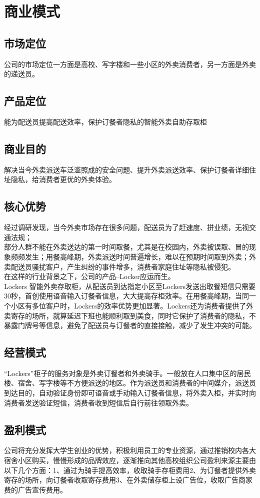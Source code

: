 \documentclass[violet]{main}
\begin{document}
		\section{商业模式}
			\subsection{市场定位}
				公司的市场定位一方面是高校、写字楼和一些小区的外卖消费者，另一方面是外卖的递送员。
			\subsection{产品定位}
				能为配送员提高配送效率，保护订餐者隐私的智能外卖自助存取柜
			\subsection{商业目的}
				解决当今外卖派送车泛滥照成的安全问题、提升外卖派送效率、保护订餐者详细住址隐私，给消费者更优的外卖体验。
			\subsection{核心优势}
				经过调研发现，当今外卖市场存在很多问题，配送员为了赶速度、拼业绩，无视交通法规；
				\\\indent 部分人群不能在外卖送达的第一时间取餐，尤其是在校园内，外卖被误取、冒的现象频频发生；用餐高峰期，外卖派送时间普遍增长，难以在预期时间取到外卖；外卖配送员骚扰客户，产生纠纷的事件增多，消费者家庭住址等隐私被侵犯。
				\\\indent 在这样的行业背景之下，公司的产品--Locker应运而生。
				\\\indent Lockers 智能外卖存取柜，从配送员到达指定小区至Lockers发送出取餐短信只需要30秒，首创使用语音输入订餐者信息，大大提高存柜效率。在用餐高峰期，当同一个小区有多位客户时，Lockers的效率优势更加显著。Lockers还为消费者提供了外卖寄存的场所，就算延迟下班也能顺利取到美食，同时它保护了消费者的隐私，不暴露门牌号等信息，避免了配送员与订餐者的直接接触，减少了发生冲突的可能。
			\subsection{经营模式}
				“Lockers”柜子的服务对象是外卖订餐者和外卖骑手。一般放在人口集中区的居民楼、宿舍、写字楼等不方便派送的地区。作为派送员和消费者的中间媒介，派送员到达目的，自动验证身份即可语音或手动输入订餐者信息，将外卖入柜，并实时向消费者发送验证短信，消费者收到短信后自行前往领取外卖。
			\subsection{盈利模式}
				公司将充分发挥大学生创业的优势，积极利用员工的专业资源，通过推销校内各大宿舍小区购买，慢慢形成的品牌效应，逐渐推向其他高校组织公司盈利来源主要由以下几个方面：1、通过为骑手提高效率，收取骑手存柜费用2、为订餐者提供外卖寄存的场所，向订餐者收取寄存费用3、在外卖储存柜上设广告位，收取广告商家费的广告宣传费用。
\end{document}
